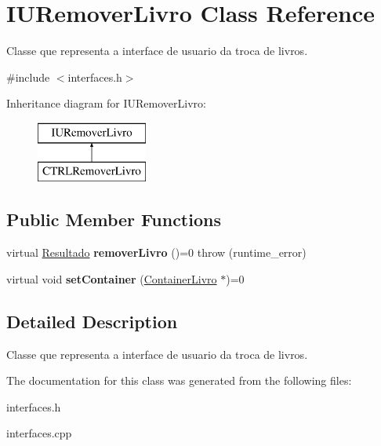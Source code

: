 \hypertarget{classIURemoverLivro}{}\section{I\+U\+Remover\+Livro Class Reference}
\label{classIURemoverLivro}


Classe que representa a interface de usuario da troca de livros.  




{\ttfamily \#include $<$interfaces.\+h$>$}

Inheritance diagram for I\+U\+Remover\+Livro\+:\begin{figure}[H]
\begin{center}
\leavevmode
\includegraphics[height=2.000000cm]{classIURemoverLivro}
\end{center}
\end{figure}
\subsection*{Public Member Functions}
\begin{DoxyCompactItemize}
\item 
\mbox{\label{classIURemoverLivro_a85a956c72daeaa793d68f9f5811b53e7}} 
virtual \hyperlink{classResultado}{Resultado} {\bfseries remover\+Livro} ()=0  throw (runtime\+\_\+error)
\item 
\mbox{\label{classIURemoverLivro_a2e8367d355cc4a6cc9c267f3fffb2dcc}} 
virtual void {\bfseries set\+Container} (\hyperlink{classContainerLivro}{Container\+Livro} $\ast$)=0
\end{DoxyCompactItemize}


\subsection{Detailed Description}
Classe que representa a interface de usuario da troca de livros. 

The documentation for this class was generated from the following files\+:\begin{DoxyCompactItemize}
\item 
interfaces.\+h\item 
interfaces.\+cpp\end{DoxyCompactItemize}
